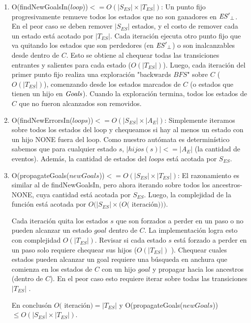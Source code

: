 \begin{enumerate}
	\item O(findNewGoalsIn($loop$))$ <= O(|S_{ES}| \times |T_{ES}|)$: 
	Un punto fijo progresivamente remueve todos los estados que no son ganadores en $\mathit{{\mathit{ES}'}_{\bot}}$.
	En el peor caso se deben remover $|S_{ES}|$ estados, y el costo de remover cada un estado está acotado por $|T_{ES}|$.
	Cada iteración ejecuta otro punto fijo que va quitando los estados que son perdedores (en $\mathit{{\mathit{ES}'}_{\bot}}$)
	o son inalcanzables desde dentro de $C$.
	Esto se obtiene al chequear todas las transiciones entrantes y salientes para cada estado ($O(|T_{ES}|)$). 
	Luego, cada iteración del primer punto fijo realiza una exploración "backwards $BFS$" sobre $C$ ($O(|T_{ES}|)$), comenzando desde los estados marcados de $C$ (o estados que tienen un hijo en $\mathit{Goals}$). Cuando la exploración termina, todos los estados de $C$ que no fueron alcanzados son removidos.
	
	\item O(findNewErrorsIn($loops$))$ <= O(|S_{ES}| \times |A_E|)$: Simplemente iteramos sobre todos los estados del loop y chequeamos si hay al menos un estado con un hijo NONE fuera del loop. Como nuestro autómata es determinístico sabemos que para cualquier estado $s$, 
	$|hijos(s)|<=|A_E|$ (la cantidad de eventos). Además, la cantidad de estados del $loops$ está acotada por $S_{ES}$.
	
	\item O(propagateGoals($newGoals$))$ <= O(|S_{ES}| \times |T_{ES}|)$: 
	El razonamiento es similar al de findNewGoalsIn, pero ahora iterando sobre todos los ancestros-NONE, cuya cantidad está acotada por $S_{ES}$. Luego, la complejidad de la función está acotada por $O(|S_{ES}| \times (O($ 
	iteración$)))$. 
	
	Cada iteración quita los estados $s$ que son forzados a perder en un paso o no pueden alcanzar un estado $goal$ dentro de $C$. La
	implementación logra esto con complejidad $O(|T_{ES}|)$. Revisar si cada estado $s$ está forzado a perder en un paso solo requiere chequear sus hijos ($O(|T_{ES}|)$ ). Chequear cuales estados pueden alcanzar un goal requiere una búsqueda en anchura que comienza en los estados de $C$ con un hijo $goal$ y propagar hacia los ancestros (dentro de $C$).
	En el peor caso esto requiere iterar sobre todas las transiciones $|T_{ES}|$ .
	
	En conclusón $O($ iteración$) = |T_{ES}|$  y O(propagateGoals($newGoals$))$ \leq O(|S_{ES}| \times 
	|T_{ES}|)$.
	

\end{enumerate}
